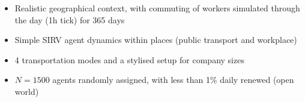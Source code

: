 {%

\begin{itemize}
	\item Realistic geographical context, with commuting of workers simulated through the day (1h tick) for 365 days
	\item Simple SIRV agent dynamics within places (public transport and workplace)
	\item 4 transportation modes and a stylised setup for company sizes
	\item $N=1500$ agents randomly assigned, with less than 1\% daily renewed (open world)
\end{itemize}

}

